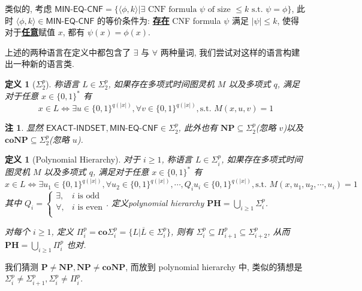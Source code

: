 \documentclass[8pt]{article}
\theoremstyle{compact}
\newtheorem{definition}[theorem]{定义}
\newtheorem{remark}[theorem]{注}
\def\obj#1{\textbf{\uline{#1}}}
\def\le{\leqslant}
\def\ge{\geqslant}
\def\P{\textbf{P}}
\def\NP{\textbf{NP}}
\def\coNP{\textbf{coNP}}
\def\PH{\textbf{PH}}
\begin{document}
类似的, 考虑 $\textsf{MIN-EQ-CNF} = \{\langle\phi, k\rangle | \exists \text{ CNF formula } \psi \text{ of size } \le k \text{ s.t. } \psi = \phi\}$, 此时 $\langle \phi, k \rangle \in \textsf{MIN-EQ-CNF}$ 的等价条件为: \obj{存在} CNF formula $\psi$ 满足 $|\psi| \le k$, 使得对于\obj{任意}赋值 $x$, 都有 $\psi(x) = \phi(x)$.

上述的两种语言在定义中都包含了 $\exists$ 与 $\forall$ 两种量词, 我们尝试对这样的语言构建出一种新的语言类.

\begin{definition}[$\Sigma_2^p$]
	称语言 $L \in \Sigma_2^p$, 如果存在多项式时间图灵机 $M$ 以及多项式 $q$, 满足对于任意 $x \in \{0, 1\}^*$ 有 $$x \in L \Leftrightarrow \exists u \in \{0, 1\}^{q(|x|)}, \forall v \in \{0, 1\}^{q(|x|)}, \text{s.t. } M(x, u, v) = 1$$
\end{definition}
\begin{remark}
	显然 $\textsf{EXACT-INDSET}, \textsf{MIN-EQ-CNF} \in \Sigma_2^p$, 此外也有 $\NP \subseteq \Sigma_2^p$(忽略 $v$)以及 $\coNP \subseteq \Sigma_2^p$(忽略 $u$).
\end{remark}
\begin{definition}[Polynomial Hierarchy]
	对于 $i \ge 1$, 称语言 $L \in \Sigma_i^p$, 如果存在多项式时间图灵机 $M$ 以及多项式 $q$, 满足对于任意 $x \in \{0, 1\}^*$ 有 $$x \in L \Leftrightarrow \exists u_1 \in \{0, 1\}^{q(|x|)}, \forall u_2 \in \{0, 1\}^{q(|x|)}, \cdots, Q_i u_i \in \{0, 1\}^{q(|x|)}, \text{s.t. } M(x, u_1, u_2, \cdots, u_i) = 1$$
	其中 $Q_i = \begin{cases}
		\exists, & i \text{ is odd}\\
		\forall, & i \text{ is even}\\
	\end{cases}$. 定义polynomial hierarchy $\PH = \bigcup_{i \ge 1} \Sigma_i^p$.

	对每个 $i \ge 1$, 定义 $\Pi_i^p = \textbf{co}\Sigma_i^p = \{L | \overline{L} \in \Sigma_i^p\}$, 则有 $\Sigma_i^p \subseteq \Pi_{i+1}^p \subseteq \Sigma_{i+2}^p$, 从而 $\PH = \bigcup_{i \ge 1}\Pi_i^p$ 也对.
\end{definition}

我们猜测 $\P \neq \NP, \NP \neq \coNP$, 而放到 polynomial hierarchy 中, 类似的猜想是 $\Sigma_i^p \neq \Sigma_{i+1}^p, \Sigma_i^p \neq \Pi_i^p$.
\end{document}
